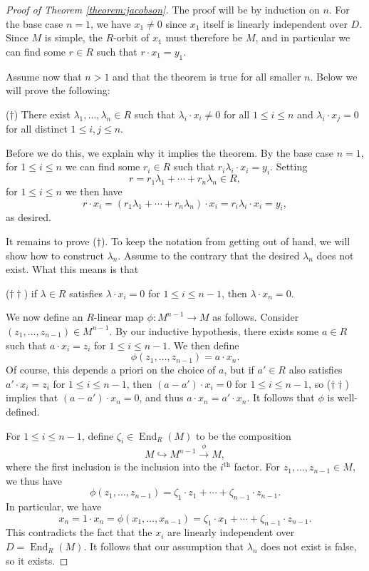 \documentclass[11pt]{article}
\numberwithin{equation}{section}
\theoremstyle{plain}
\theoremstyle{definition}
\DeclareMathOperator{\End}{End}
\begin{document}
\begin{proof}[Proof of Theorem \ref{theorem:jacobson}]
The proof will be by induction on $n$.  For the base case $n=1$, we have
$x_1 \neq 0$ since $x_1$ itself is linearly independent over $D$.  Since $M$
is simple, the $R$-orbit of $x_1$ must therefore be $M$, and in particular
we can find some $r \in R$ such that $r \cdot x_1 = y_1$.

Assume now that $n>1$ and that the theorem is true for all smaller $n$.  Below
we will prove the following:
\begin{compactitem}
\item[($\dagger$)] 
There exist $\lambda_1,\ldots,\lambda_n \in R$ such that $\lambda_i \cdot x_i \neq 0$
for all $1 \leq i \leq n$ and $\lambda_i \cdot x_j = 0$ for all distinct
$1 \leq i,j \leq n$.
\end{compactitem}
Before we do this, we explain why it implies the theorem.  By the base case $n=1$,
for $1 \leq i \leq n$ we can find some $r_i \in R$ such that $r_i \lambda_i \cdot x_i = y_i$.
Setting
\[r = r_1 \lambda_1 + \cdots + r_n \lambda_n \in R,\]
for $1 \leq i \leq n$ we then have
\[r \cdot x_i = (r_1 \lambda_1 + \cdots + r_n \lambda_n) \cdot x_i = r_i \lambda_i \cdot x_i = y_i,\]
as desired.

It remains to prove ($\dagger$).  To keep the notation from getting out of hand, we will show how
to construct $\lambda_n$.  Assume to the contrary 
that the desired $\lambda_n$ does not exist.  What this means is that
\begin{compactitem}
\item[($\dagger\dagger$)] if $\lambda \in R$ satisfies $\lambda \cdot x_i = 0$ for $1 \leq i \leq n-1$, then $\lambda \cdot x_n = 0$.
\end{compactitem}
We now define an $R$-linear map $\phi\colon M^{n-1} \rightarrow M$ as follows.
Consider $(z_1,\ldots,z_{n-1}) \in M^{n-1}$.  By our inductive hypothesis, there exists
some $a \in R$ such that $a \cdot x_i = z_i$ for $1 \leq i \leq n-1$.  We then
define
\[\phi(z_1,\ldots,z_{n-1}) = a \cdot x_n.\]
Of course, this depends a priori on the choice of $a$, but if $a' \in R$ also satisfies
$a' \cdot x_i = z_i$ for $1 \leq i \leq n-1$, then $(a-a') \cdot x_i = 0$ for
$1 \leq i \leq n-1$, so ($\dagger\dagger$) implies that $(a-a') \cdot x_n = 0$, 
and thus $a \cdot x_n = a' \cdot x_n$.  It follows that $\phi$ is well-defined.

For $1 \leq i \leq n-1$, define $\zeta_i \in \End_R(M)$ to be the composition
\[M \hookrightarrow M^{n-1} \stackrel{\phi}{\rightarrow} M,\]
where the first inclusion is the inclusion into the $i^{\text{th}}$ factor.  For
$z_1,\ldots,z_{n-1} \in M$, we thus have
\[\phi(z_1,\ldots,z_{n-1}) = \zeta_1 \cdot z_1+\cdots+\zeta_{n-1} \cdot z_{n-1}.\]
In particular, we have
\[x_n = 1 \cdot x_n = \phi(x_1,\ldots,x_{n-1}) = \zeta_1 \cdot x_1+\cdots+\zeta_{n-1} \cdot z_{n-1}.\]
This contradicts the fact that the $x_i$ are linearly independent over $D = \End_R(M)$.
It follows that our assumption that $\lambda_n$ does not exist is false, so it exists.
\end{proof}
\end{document}
